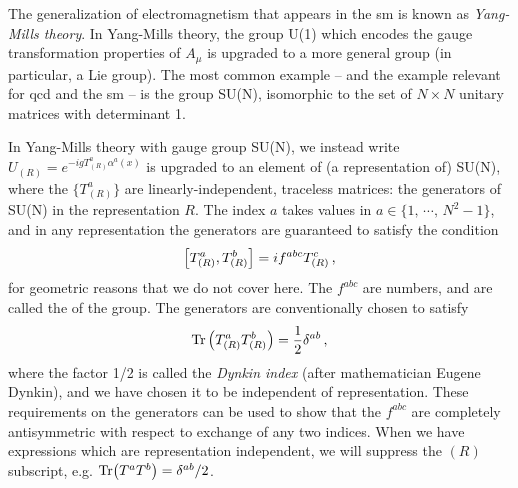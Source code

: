 The generalization of electromagnetism that appears in the \gls{sm} is known as \textit{Yang-Mills theory}.
%
In Yang-Mills theory, the group U(1) which encodes the gauge transformation properties of \(A_\mu\) is upgraded to a more general group (in particular, a Lie group).
%
The most common example -- and the example relevant for \gls{qcd} and the \gls{sm} -- is the group SU(N), isomorphic to the set of \(N\times N\) unitary matrices with determinant 1.



In Yang-Mills theory with gauge group SU(N), we instead write \(U_{(R)} = e^{-i g T_{(R)}^a \alpha^a(x)}\) is upgraded to an element of (a representation of) SU(N), where the \(\{T^a_{(R)}\}\) are linearly-independent, traceless matrices:
%
the generators of SU(N) in the representation \(R\).
%
The index \(a\) takes values in \(a \in \{1,\,\cdots,\,N^2-1\}\), and in any representation the generators are guaranteed to satisfy the condition
\begin{align}
    \comm{T^a_{(R)}}{T^b_{(R)}}
    =
    i f^{abc} T^c_{(R)}
    \,,
\end{align}
for geometric reasons that we do not cover here.
%
The \(f^{abc}\) are numbers, and are called the  of the group.
%
The generators are conventionally chosen to satisfy
\begin{align}
    \Tr\left(T_{(R)}^a T_{(R)}^b\right) = \frac{1}{2} \delta^{ab}
    \,,
\end{align}
where the factor 1/2 is called the \textit{Dynkin index} (after mathematician Eugene Dynkin), and we have chosen it to be independent of representation.
%
These requirements on the generators can be used to show that the \(f^{abc}\) are completely antisymmetric with respect to exchange of any two indices.
%
When we have expressions which are representation independent, we will suppress the \((R)\) subscript, e.g. \(\Tr (T^a T^b) = \delta^{ab}/2\).


